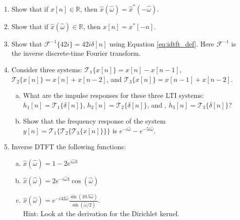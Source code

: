 \begin{enumerate}
  \item Show that if $x[n] \in \mathbb{R}$, then $\hat{x}(\hat{\omega}) = \hat{x}^*(-\hat{\omega})$.

  \item Show that if $\hat{x}(\hat{\omega}) \in \mathbb{R}$, then $x[n]=x^*[-n]$.

  \item Show that $\mathcal{F}^{-1}\{42 i\}=42i\delta[n]$ using Equation \ref{eq:idtft_def}. Here $\mathcal{F}^{-1}$ is the inverse discrete-time Fourier transform.

  \item Consider three systems: $\mathcal{T}_1\{x[n]\} = x[n]-x[n-1]$,  $\mathcal{T}_2\{x[n]\} = x[n]+x[n-2]$, and
        $\mathcal{T}_3\{x[n]\} = x[n-1]+x[n-2]$.
        \begin{enumerate}[a)]
          \item What are the impulse responses for these three LTI systems: $h_1[n]=\mathcal{T}_1\{\delta[n]\}$, $h_2[n]=\mathcal{T}_2\{\delta[n]\}$, and ,  $h_3[n]=\mathcal{T}_3\{\delta[n]\}$?
          \item Show that the frequency response of the system $y[n]=\mathcal{T}_1\{\mathcal{T}_2\{\mathcal{T}_3\{x[n]\}\}\}$ is $e^{-i\hat{\omega}}-e^{-5i\hat{\omega}}$.
        \end{enumerate}

  \item Inverse DTFT the following functions:
        \begin{enumerate}[a)]
          \item $\hat{x}(\hat{\omega})=1-2e^{i\hat{\omega}3}$
          \item $\hat{x}(\hat{\omega})=2e^{-i\hat{\omega}3}\cos(\hat{\omega})$
          \item $\hat{x}(\hat{\omega})=e^{-i 42 \hat{\omega}} \frac{\sin(10.5 \hat{\omega})}{\sin(\hat{\omega}/2)}$.\\
                Hint: Look at the derivation for the Dirichlet kernel.
        \end{enumerate}

\end{enumerate}


